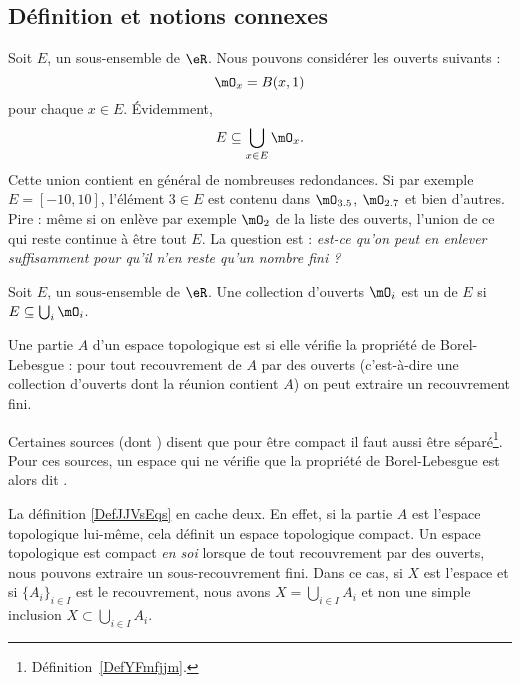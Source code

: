 \subsection{Définition et notions connexes}

Soit \( E\), un sous-ensemble de \( \eR\). Nous pouvons considérer les ouverts suivants :
\begin{equation}
	\mO_x=B(x,1)
\end{equation}
pour chaque \( x\in E\). Évidemment,
\begin{equation}
	E\subseteq \bigcup_{x\in E}\mO_x.
\end{equation}
Cette union contient en général de nombreuses redondances. Si par exemple \( E=[-10,10]\), l'élément \( 3\in E\) est contenu dans \( \mO_{3.5}\), \( \mO_{2.7}\) et bien d'autres. Pire : même si on enlève par exemple \( \mO_2\) de la liste des ouverts, l'union de ce qui reste continue à être tout \( E\). La question est : \emph{est-ce qu'on peut en enlever suffisamment pour qu'il n'en reste qu'un nombre fini ?}

\begin{definition}
	Soit \( E\), un sous-ensemble de \( \eR\). Une collection d'ouverts \( \mO_i\) est un  de \( E\) si \( E\subseteq \bigcup_{i}\mO_i\).
\end{definition}

\begin{definition} \label{DefJJVsEqs}
	Une partie \( A\) d'un espace topologique est  si elle vérifie la propriété de Borel-Lebesgue : pour tout recouvrement de \( A\) par des ouverts (c'est-à-dire une collection d'ouverts dont la réunion contient \( A\)) on peut extraire un recouvrement fini.
\end{definition}

\begin{remark}
	Certaines sources (dont ) disent que pour être compact il faut aussi être séparé\footnote{Définition~\ref{DefYFmfjjm}.}. Pour ces sources, un espace qui ne vérifie que la propriété de Borel-Lebesgue est alors dit .
\end{remark}

\begin{normaltext}
	La définition \ref{DefJJVsEqs} en cache deux. En effet, si la partie \( A\) est l'espace topologique lui-même, cela définit un espace topologique compact. Un espace topologique est compact \emph{en soi} lorsque de tout recouvrement par des ouverts, nous pouvons extraire un sous-recouvrement fini. Dans ce cas, si \( X\) est l'espace et si \( \{ A_i \}_{i\in I}\) est le recouvrement, nous avons \( X=\bigcup_{i\in I}A_i\) et non une simple inclusion \( X\subset \bigcup_{i\in I}A_i\).
\end{normaltext}

